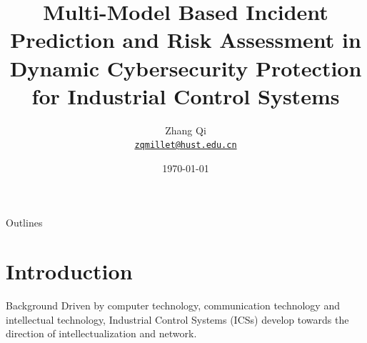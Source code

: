 \documentclass[10pt, compress]{beamer}
\title{Multi-Model Based Incident Prediction and Risk Assessment in Dynamic Cybersecurity Protection for Industrial Control Systems}
\subtitle{}
\date{\today}
\author[Zhang Qi] %
{
  Zhang Qi\\
  \href{mailto:qiqi@hust.edu.cn}{{\tt zqmillet@hust.edu.cn}}
}
\institute{Automation School,\\Huazhong University of Science and Technology,\\Wuhan.}
\begin{document}
\maketitle

\begin{frame}[noframenumbering]{Outlines}
    \tableofcontents %
\end{frame}

\section{Introduction}
\begin{frame}{Background}
    Driven by computer technology, communication technology and intellectual technology, Industrial Control Systems (ICSs) develop towards the direction of intellectualization and network.
    \begin{center}
        
    \end{center}
\end{frame}
\end{document}
